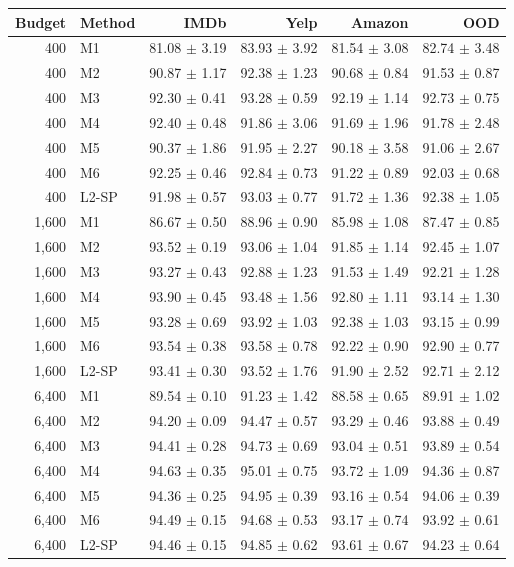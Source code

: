 \begin{tabular}{rlrrrr}\toprule
Budget & Method & IMDb & Yelp & Amazon & OOD\\\midrule
400 & M1 & 81.08 $\pm$ 3.19 & 83.93 $\pm$ 3.92 & 81.54 $\pm$ 3.08 & 82.74 $\pm$ 3.48\\
400 & M2 & 90.87 $\pm$ 1.17 & 92.38 $\pm$ 1.23 & 90.68 $\pm$ 0.84 & 91.53 $\pm$ 0.87\\
400 & M3 & 92.30 $\pm$ 0.41 & 93.28 $\pm$ 0.59 & 92.19 $\pm$ 1.14 & 92.73 $\pm$ 0.75\\
400 & M4 & 92.40 $\pm$ 0.48 & 91.86 $\pm$ 3.06 & 91.69 $\pm$ 1.96 & 91.78 $\pm$ 2.48\\
400 & M5 & 90.37 $\pm$ 1.86 & 91.95 $\pm$ 2.27 & 90.18 $\pm$ 3.58 & 91.06 $\pm$ 2.67\\
400 & M6 & 92.25 $\pm$ 0.46 & 92.84 $\pm$ 0.73 & 91.22 $\pm$ 0.89 & 92.03 $\pm$ 0.68\\
400 & L2-SP & 91.98 $\pm$ 0.57 & 93.03 $\pm$ 0.77 & 91.72 $\pm$ 1.36 & 92.38 $\pm$ 1.05\\
1,600 & M1 & 86.67 $\pm$ 0.50 & 88.96 $\pm$ 0.90 & 85.98 $\pm$ 1.08 & 87.47 $\pm$ 0.85\\
1,600 & M2 & 93.52 $\pm$ 0.19 & 93.06 $\pm$ 1.04 & 91.85 $\pm$ 1.14 & 92.45 $\pm$ 1.07\\
1,600 & M3 & 93.27 $\pm$ 0.43 & 92.88 $\pm$ 1.23 & 91.53 $\pm$ 1.49 & 92.21 $\pm$ 1.28\\
1,600 & M4 & 93.90 $\pm$ 0.45 & 93.48 $\pm$ 1.56 & 92.80 $\pm$ 1.11 & 93.14 $\pm$ 1.30\\
1,600 & M5 & 93.28 $\pm$ 0.69 & 93.92 $\pm$ 1.03 & 92.38 $\pm$ 1.03 & 93.15 $\pm$ 0.99\\
1,600 & M6 & 93.54 $\pm$ 0.38 & 93.58 $\pm$ 0.78 & 92.22 $\pm$ 0.90 & 92.90 $\pm$ 0.77\\
1,600 & L2-SP & 93.41 $\pm$ 0.30 & 93.52 $\pm$ 1.76 & 91.90 $\pm$ 2.52 & 92.71 $\pm$ 2.12\\
6,400 & M1 & 89.54 $\pm$ 0.10 & 91.23 $\pm$ 1.42 & 88.58 $\pm$ 0.65 & 89.91 $\pm$ 1.02\\
6,400 & M2 & 94.20 $\pm$ 0.09 & 94.47 $\pm$ 0.57 & 93.29 $\pm$ 0.46 & 93.88 $\pm$ 0.49\\
6,400 & M3 & 94.41 $\pm$ 0.28 & 94.73 $\pm$ 0.69 & 93.04 $\pm$ 0.51 & 93.89 $\pm$ 0.54\\
6,400 & M4 & 94.63 $\pm$ 0.35 & 95.01 $\pm$ 0.75 & 93.72 $\pm$ 1.09 & 94.36 $\pm$ 0.87\\
6,400 & M5 & 94.36 $\pm$ 0.25 & 94.95 $\pm$ 0.39 & 93.16 $\pm$ 0.54 & 94.06 $\pm$ 0.39\\
6,400 & M6 & 94.49 $\pm$ 0.15 & 94.68 $\pm$ 0.53 & 93.17 $\pm$ 0.74 & 93.92 $\pm$ 0.61\\
6,400 & L2-SP & 94.46 $\pm$ 0.15 & 94.85 $\pm$ 0.62 & 93.61 $\pm$ 0.67 & 94.23 $\pm$ 0.64\\
\bottomrule\end{tabular}
